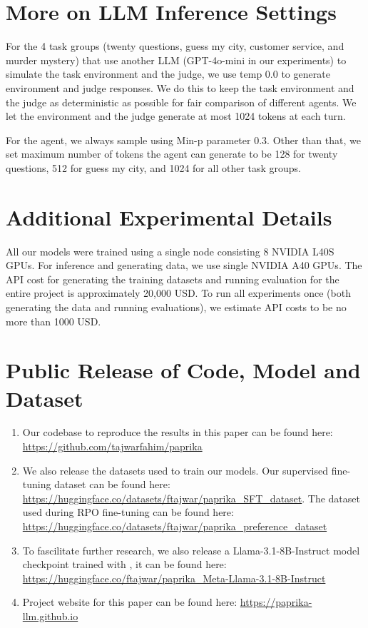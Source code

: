 \newpage

\section{More on LLM Inference Settings}

For the 4 task groups (twenty questions, guess my city, customer service, and murder mystery) that use another LLM (GPT-4o-mini in our experiments) to simulate the task environment and the judge, we use temp 0.0 to generate environment and judge responses. We do this to keep the task environment and the judge as deterministic as possible for fair comparison of different agents. We let the environment and the judge generate at most 1024 tokens at each turn.

For the agent, we always sample using Min-p parameter $0.3$. Other than that, we set maximum number of tokens the agent can generate to be  128 for twenty questions, 512 for guess my city, and 1024 for all other task groups. 

\section{Additional Experimental Details}

All our models were trained using a single node consisting 8 NVIDIA L40S GPUs. For inference and generating data, we use single NVIDIA A40 GPUs. The API cost for generating the training datasets and running evaluation for the entire project is approximately 20,000 USD. To run all experiments once (both generating the data and running evaluations), we estimate API costs to be no more than 1000 USD.

\section{Public Release of Code, Model and Dataset}

\begin{enumerate}
    \item Our codebase to reproduce the results in this paper can be found here: \url{https://github.com/tajwarfahim/paprika}
    \item We also release the datasets used to train our models. Our supervised fine-tuning dataset can be found here: \url{https://huggingface.co/datasets/ftajwar/paprika_SFT_dataset}. The dataset used during RPO fine-tuning can be found here: \url{https://huggingface.co/datasets/ftajwar/paprika_preference_dataset}
    \item To fascilitate further research, we also release a Llama-3.1-8B-Instruct model checkpoint trained with \ours{}, it can be found here: \url{https://huggingface.co/ftajwar/paprika_Meta-Llama-3.1-8B-Instruct}
    \item Project website for this paper can be found here: \url{https://paprika-llm.github.io}
\end{enumerate}

